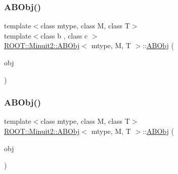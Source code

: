 \subsubsection{\texorpdfstring{ABObj()}{ABObj()}\hspace{0.1cm}{\footnotesize\ttfamily [4/8]}}
{\footnotesize\ttfamily template$<$class mtype, class M, class T$>$ \\
template$<$class b , class c $>$ \\
\mbox{\hyperlink{classROOT_1_1Minuit2_1_1ABObj}{R\+O\+O\+T\+::\+Minuit2\+::\+A\+B\+Obj}}$<$ mtype, M, T $>$\+::\mbox{\hyperlink{classROOT_1_1Minuit2_1_1ABObj}{A\+B\+Obj}} (\begin{DoxyParamCaption}\item[{const \mbox{\hyperlink{classROOT_1_1Minuit2_1_1ABObj}{A\+B\+Obj}}$<$ mtype, b, c $>$ \&}]{obj }\end{DoxyParamCaption})\hspace{0.3cm}{\ttfamily [inline]}}

\mbox{\label{classROOT_1_1Minuit2_1_1ABObj_a48561e673ca2a4a05b9e67af09b1736a}} 
\subsubsection{\texorpdfstring{ABObj()}{ABObj()}\hspace{0.1cm}{\footnotesize\ttfamily [5/8]}}
{\footnotesize\ttfamily template$<$class mtype, class M, class T$>$ \\
\mbox{\hyperlink{classROOT_1_1Minuit2_1_1ABObj}{R\+O\+O\+T\+::\+Minuit2\+::\+A\+B\+Obj}}$<$ mtype, M, T $>$\+::\mbox{\hyperlink{classROOT_1_1Minuit2_1_1ABObj}{A\+B\+Obj}} (\begin{DoxyParamCaption}\item[{const M \&}]{obj }\end{DoxyParamCaption})\hspace{0.3cm}{\ttfamily [inline]}}

\mbox{\label{classROOT_1_1Minuit2_1_1ABObj_a2406012a4e1bd70d0a92c2468eaaee7c}} 
